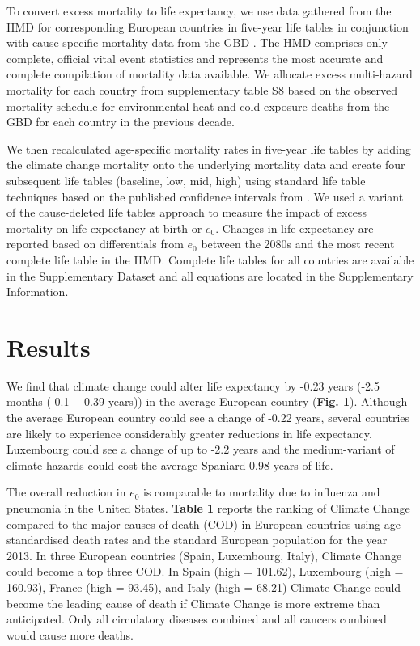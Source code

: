 \documentclass[12pt,]{article}
\begin{document}
To convert excess mortality to life expectancy, we use data gathered
from the HMD \citep{HMD} for corresponding European countries in
five-year life tables in conjunction with cause-specific mortality data
from the GBD \citep{GBD, wang2012age}. The HMD comprises only complete,
official vital event statistics and represents the most accurate and
complete compilation of mortality data available. We allocate excess
multi-hazard mortality for each country from supplementary table S8
\citep{forzieri2017increasing} based on the observed mortality schedule
for environmental heat and cold exposure deaths from the GBD for each
country in the previous decade.

We then recalculated age-specific mortality rates in five-year life
tables by adding the climate change mortality onto the underlying
mortality data and create four subsequent life tables (baseline, low,
mid, high) using standard life table techniques \citep{wunsch2013life}
based on the published confidence intervals from
\citep{forzieri2017increasing}. We used a variant of the cause-deleted
life tables approach
\citep{brand2005approximations, beltran2008integrated} to measure the
impact of excess mortality on life expectancy at birth or \(e_0\).
Changes in life expectancy are reported based on differentials from
\(e_0\) between the 2080s and the most recent complete life table in the
HMD. Complete life tables for all countries are available in the
Supplementary Dataset and all equations are located in the Supplementary
Information.

\section{Results}\label{results}

We find that climate change could alter life expectancy by -0.23 years
(-2.5 months (-0.1 - -0.39 years)) in the average European country
(\textbf{Fig. 1}). Although the average European country could see a
change of -0.22 years, several countries are likely to experience
considerably greater reductions in life expectancy. Luxembourg could see
a change of up to -2.2 years and the medium-variant of climate hazards
could cost the average Spaniard 0.98 years of life.

The overall reduction in \(e_0\) is comparable to mortality due to
influenza and pneumonia \citep{arias2013united} in the United States.
\textbf{Table 1} reports the ranking of Climate Change compared to the
major causes of death (COD) in European countries using age-standardised
death rates and the standard European population
\citep{pace2013revision} for the year 2013. In three European countries
(Spain, Luxembourg, Italy), Climate Change could become a top three COD.
In Spain (high = 101.62), Luxembourg (high = 160.93), France (high =
93.45), and Italy (high = 68.21) Climate Change could become the leading
cause of death if Climate Change is more extreme than anticipated. Only
all circulatory diseases combined and all cancers combined would cause
more deaths.
\end{document}
